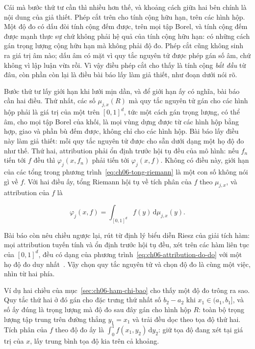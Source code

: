Cái mà bước thứ tư cần thì nhiều hơn thế, và khoảng cách giữa hai bên chính là
nội dung của giả thiết. Phép cắt trên cho tính cộng hữu hạn, trên các hình hộp.
Một độ đo có dấu đòi tính cộng đếm được, trên mọi tập Borel, và tính cộng đếm
được mạnh thực sự chứ không phải hệ quả của tính cộng hữu hạn: có những cách gán
trọng lượng cộng hữu hạn mà không phải độ đo. Phép cắt cũng không sinh ra giá
trị âm nào; dấu âm có mặt vì quy tắc nguyên tử được phép gán số âm, chứ không vì
lập luận vừa rồi. Vì vậy điều phép cắt cho thấy là tính cộng \emph{bắt đầu} từ
đâu, còn phần còn lại là điều bài báo lấy làm giả thiết, như đoạn dưới nói rõ.

Bước thứ tư lấy giới hạn khi lưới mịn dần, và để giới hạn ấy có nghĩa, bài báo
cần hai điều. Thứ nhất, các số $\mu_{j,x}(R)$ mà quy tắc nguyên tử gán cho các
hình hộp phải là giá trị của một
 trên $[0,1]^d$,
tức một cách gán trọng lượng, có thể âm, cho mọi tập Borel của khối, là mọi
vùng dựng được từ các hình hộp bằng hợp, giao và phần bù đếm được, không chỉ
cho các hình hộp. Bài báo lấy điều này làm giả thiết: mỗi quy tắc nguyên tử
được cho sẵn dưới dạng một họ độ đo như thế. Thứ hai, attribution phải ổn định trước hội
tụ đều của mô hình: nếu $f_n$ tiến tới $f$ đều thì $\varphi_j(x,f_n)$ phải
tiến tới $\varphi_j(x,f)$. Không có điều này, giới hạn của các tổng trong
phương trình~\ref{eq:ch06-tong-riemann} là một con số không nói gì về $f$. Với
hai điều ấy, tổng Riemann hội tụ về tích phân của $f$ theo
 $\mu_{j,x}$, và attribution của $f$ là

\begin{equation}
\label{eq:ch06-attribution-do-do}
\varphi_j(x,f)=\int_{[0,1]^d} f(y)\,\mathrm{d}\mu_{j,x}(y).
\end{equation}

Bài báo còn nêu chiều ngược lại, rút từ định lý biểu diễn Riesz của giải tích
hàm: mọi attribution tuyến tính và ổn định trước hội tụ đều, xét trên các hàm
liên tục của $[0,1]^d$, đều có dạng của phương
trình~\ref{eq:ch06-attribution-do-do} với một họ độ đo duy
nhất~\autocite{p17firstprinciples}. Vậy chọn quy tắc nguyên tử và chọn độ đo là
cùng một việc, nhìn từ hai phía.

Ví dụ hai chiều của mục~\ref{sec:ch06-ham-chi-bao} cho thấy một độ đo trông ra
sao. Quy tắc thứ hai ở đó gán cho đặc trưng thứ nhất số $b_2-a_2$ khi
$x_1\in(a_1,b_1]$, và số ấy đúng là trọng lượng mà độ đo sau đây gán cho hình
hộp $R$: toàn bộ trọng lượng tập trung trên đường thẳng $y_1=x_1$ và trải đều
dọc theo tọa độ thứ hai. Tích phân của $f$ theo độ đo ấy là
$\int_0^1 f(x_1,y_2)\,\mathrm{d}y_2$: giữ tọa độ đang xét tại giá trị của $x$,
lấy trung bình tọa độ kia trên cả khoảng.

